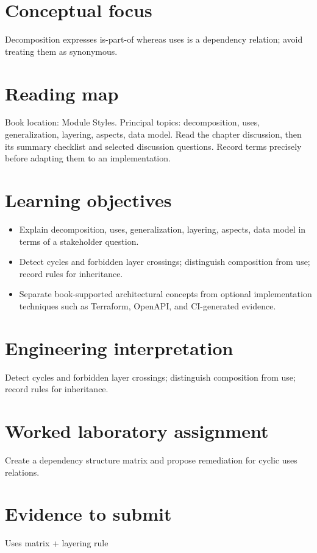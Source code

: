 \documentclass[10pt,letterpaper]{article}
\begin{document}
\DocProvenance
\section{Conceptual focus}
Decomposition expresses is-part-of whereas uses is a dependency relation; avoid treating them as synonymous.

\section{Reading map}
Book location: Module Styles. Principal topics: decomposition, uses, generalization, layering, aspects, data model. Read the chapter discussion, then its summary checklist and selected discussion questions. Record terms precisely before adapting them to an implementation.

\section{Learning objectives}
\begin{itemize}
\item Explain decomposition, uses, generalization, layering, aspects, data model in terms of a stakeholder question.
\item Detect cycles and forbidden layer crossings; distinguish composition from use; record rules for inheritance.
\item Separate book-supported architectural concepts from optional implementation techniques such as Terraform, OpenAPI, and CI-generated evidence.
\end{itemize}
\section{Engineering interpretation}
Detect cycles and forbidden layer crossings; distinguish composition from use; record rules for inheritance.

\section{Worked laboratory assignment}
Create a dependency structure matrix and propose remediation for cyclic uses relations.

\section{Evidence to submit}
Uses matrix + layering rule
\end{document}
